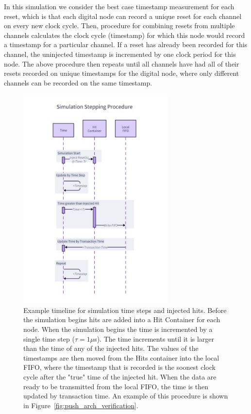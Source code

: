 In this simulation we consider the best case timestamp measurement for each reset, which is that each digital node can record a unique reset for each channel on every new clock cycle. 
Then, procedure for combining resets from multiple channels calculates the clock cycle (timestamp) for which this node would record a timestamp for a particular channel.
If a reset has already been recorded for this channel, the uninjected timestamp is incremented by one clock period for this node.
The above procedure then repeats until all channels have had all of their resets recorded on unique timestamps for the digital node, where only different channels can be recorded on the same timestamp.

\begin{figure}[]
\centering
\includegraphics[width=0.7\textwidth]{images/simulation_step_procedure.pdf}
\caption{Example timeline for simulation time steps and injected hits.
Before the simulation begins hits are added into a Hit Container for each node.
When the simulation begins the time is incremented by a single time step ($\tau = 1 \mu$\unit{s}).
The time increments until it is larger than the time of any of the injected hits.
The values of the timestamps are then moved from the Hits container into the local FIFO, where the timestamp that is recorded is the soonest clock cycle after the "true" time of the injected hit.
When the data are ready to be transmitted from the local FIFO, the time is then updated by transaction time.
An example of this procedure is shown in Figure~\ref{fig:push_arch_verification}. 
}
\end{figure}~\label{fig:simulation_step_procedure}

